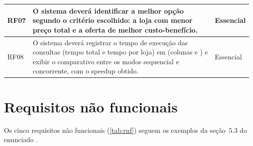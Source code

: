 \begin{xltabular}{\textwidth}{|L{1.2cm}|Y|L{1.9cm}|}
  \small RF07 & \small O sistema deverá identificar a melhor opção segundo o critério escolhido: a \textbf{loja com menor preço total} e a \textbf{oferta de melhor custo-benefício}. & \small Essencial \\ \hline
  \small RF08 & \small O sistema deverá registrar o tempo de execução das consultas (tempo total e tempo por loja) em  (colunas  e ) e exibir o comparativo entre os modos sequencial e concorrente, com o speedup obtido. & \small Essencial \\ \hline\end{xltabular}
\fonteautores

\chapter{Requisitos não funcionais}

Os cinco requisitos não funcionais (\autoref{tab:rnf}) seguem os exemplos da seção~5.3 do enunciado \cite{enunciado2026}.

